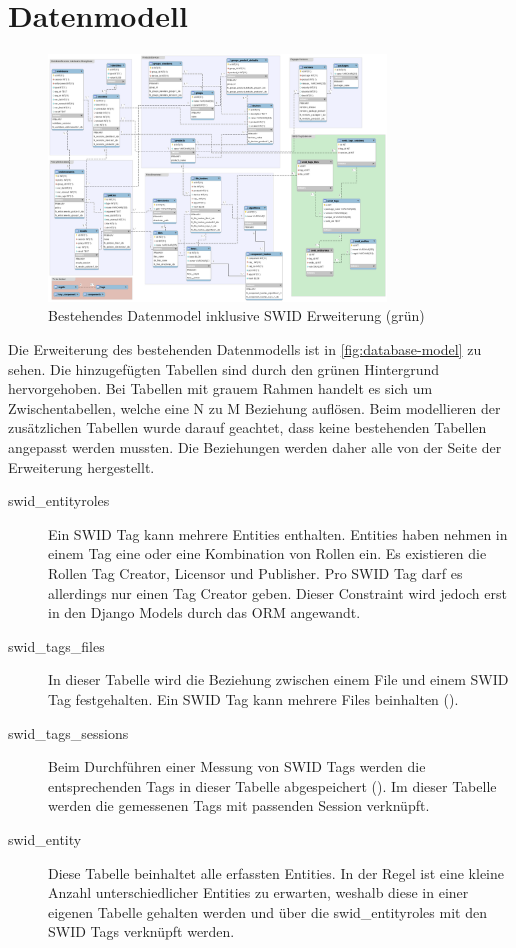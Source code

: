 \section{Datenmodell}
\begin{figure}[H]
\centering
\includegraphics[angle=90,width=0.8\textwidth]{./images/db/database-model}
\caption{Bestehendes Datenmodel inklusive SWID Erweiterung (grün)}
\label{fig:database-model}
\end{figure}
Die Erweiterung des bestehenden Datenmodells ist in \autoref{fig:database-model} zu sehen. Die hinzugefügten Tabellen sind durch den grünen Hintergrund hervorgehoben. Bei Tabellen mit grauem Rahmen handelt es sich um Zwischentabellen, welche eine N zu M Beziehung auflösen. Beim modellieren der zusätzlichen Tabellen wurde darauf geachtet, dass keine bestehenden Tabellen angepasst werden mussten. Die Beziehungen werden daher alle von der Seite der Erweiterung hergestellt.
\begin{description}
\item [swid\_entityroles] Ein SWID Tag kann mehrere Entities enthalten. Entities haben nehmen in einem Tag eine oder eine Kombination von Rollen ein. Es existieren die Rollen Tag Creator, Licensor und Publisher. Pro SWID Tag darf es allerdings nur einen Tag Creator geben. Dieser Constraint wird jedoch erst in den Django Models durch das \gls{ORM} angewandt.

\item [swid\_tags\_files] In dieser Tabelle wird die Beziehung zwischen einem File und einem SWID Tag festgehalten. Ein SWID Tag kann mehrere Files beinhalten ().

\item[swid\_tags\_sessions] Beim Durchführen einer Messung von SWID Tags werden die entsprechenden Tags in dieser Tabelle abgespeichert (). Im dieser Tabelle werden die gemessenen Tags mit passenden Session verknüpft.

\item[swid\_entity] 
Diese Tabelle beinhaltet alle erfassten Entities. In der Regel ist eine kleine Anzahl unterschiedlicher Entities zu erwarten, weshalb diese in einer eigenen Tabelle gehalten werden und über die swid\_entityroles mit den SWID Tags verknüpft werden.

\end{description}

